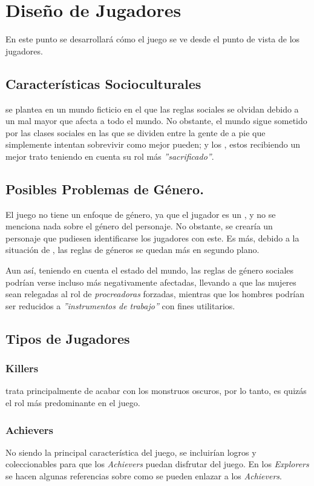 \section{Diseño de Jugadores}
    En este punto se desarrollará cómo el juego se ve desde el punto de vista de los jugadores.
    \subsection{Características Socioculturales}
        \TWD se plantea en un mundo ficticio en el que las reglas sociales se olvidan debido a un mal mayor que afecta a todo el mundo. No obstante, el mundo sigue sometido por las clases sociales en las que se dividen entre la gente de a pie que simplemente intentan sobrevivir como mejor pueden; y los \hunters, estos recibiendo un mejor trato teniendo en cuenta su rol más \textit{''sacrificado''}.
    \subsection{Posibles Problemas de Género.}
        El juego no tiene un enfoque de género, ya que el jugador es un \hunter, y no se menciona nada sobre el género del personaje. No obstante, se crearía un personaje que pudiesen identificarse los jugadores con este. Es más, debido a la situación de \humanity, las reglas de géneros se quedan más en segundo plano.

        Aun así, teniendo en cuenta el estado del mundo, las reglas de género sociales podrían verse incluso más negativamente afectadas, llevando a que las mujeres sean relegadas al rol de \textit{procreadoras} forzadas, mientras que los hombres podrían ser reducidos a \textit{''instrumentos de trabajo''} con fines utilitarios.
    \subsection{Tipos de Jugadores}
        \subsubsection{Killers}
            \TWD trata principalmente de acabar con los monstruos oscuros, por lo tanto, es quizás el rol más predominante en el juego.
        \subsubsection{Achievers}
            No siendo la principal característica del juego, se incluirían logros y coleccionables para que los \textit{Achievers} puedan disfrutar del juego. En los \textit{Explorers} se hacen algunas referencias sobre como se pueden enlazar a los \textit{Achievers}.
